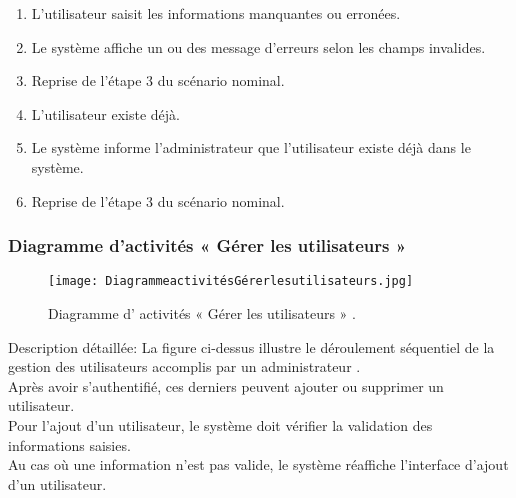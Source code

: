 \begin{itemize}
\begin{itemize}
		\begin{enumerate}
			\item L’utilisateur saisit les informations manquantes ou erronées.
			\item Le système affiche un ou des message d’erreurs selon les champs invalides.
			\item Reprise de l’étape 3 du scénario nominal.
			\item L’utilisateur existe déjà.
			\item Le système informe l’administrateur que l’utilisateur existe déjà dans le système.
			\item Reprise de l’étape 3 du scénario nominal.
		\end{enumerate}
	\end{itemize}
\end{itemize}	
\bigskip
\clearpage

\subsubsection{Diagramme d’activités « Gérer les utilisateurs » }
\begin{figure}[ht]
	\centering
	\texttt{[image: DiagrammeactivitésGérerlesutilisateurs.jpg]}
	\caption{Diagramme d' activités  « Gérer les utilisateurs »  .}
	\label{fig:Diagramme d' activités  Gérer les utilisateurs  }
\end{figure}
\FloatBarrier

{\Large \color{cyan} Description détaillée:}
La figure ci-dessus illustre le déroulement séquentiel de la gestion des utilisateurs accomplis par
un administrateur .\\
Après avoir s’authentifié, ces derniers peuvent ajouter ou supprimer un utilisateur.\\
Pour l’ajout d’un utilisateur, le système doit vérifier la validation des informations saisies.\\
 Au cas où une information n’est pas valide, le système réaffiche l’interface d’ajout d’un utilisateur.
 \clearpage
